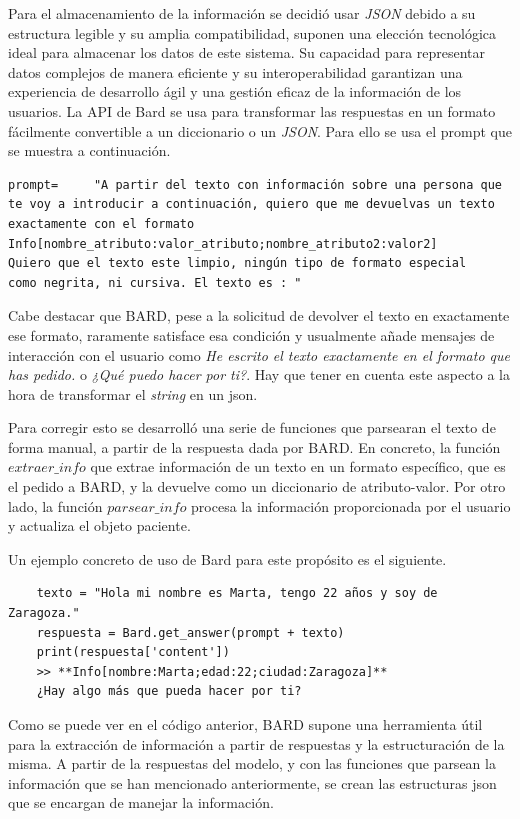 Para el almacenamiento de la información se decidió usar \textit{JSON} debido a su estructura legible y su amplia compatibilidad, suponen una elección tecnológica ideal para almacenar los datos de este sistema. Su capacidad para representar datos complejos de manera eficiente y su interoperabilidad garantizan una experiencia de desarrollo ágil y una gestión eficaz de la información de los usuarios. La API de Bard se usa para transformar las respuestas en un formato fácilmente convertible a un diccionario o un \textit{JSON}. Para ello se usa el prompt que se muestra a continuación.

\begin{verbatim}
prompt= 	"A partir del texto con información sobre una persona que
te voy a introducir a continuación, quiero que me devuelvas un texto
exactamente con el formato
Info[nombre_atributo:valor_atributo;nombre_atributo2:valor2]
Quiero que el texto este limpio, ningún tipo de formato especial
como negrita, ni cursiva. El texto es : "
\end{verbatim} 

Cabe destacar que BARD, pese a la solicitud de devolver el texto en exactamente ese formato, raramente satisface esa condición y usualmente añade mensajes de interacción con el usuario como \textit{He escrito el texto exactamente en el formato que has pedido.} o \textit{¿Qué puedo hacer por ti?}. Hay que tener en cuenta este aspecto a la hora de transformar el \textit{string} en un json. 

Para corregir esto se desarrolló una serie de funciones que parsearan el texto de forma manual, a partir de la respuesta dada por BARD. En concreto, la función $extraer\_info$ que extrae información de un texto en un formato específico, que es el pedido a BARD, y la devuelve como un diccionario de atributo-valor. Por otro lado, la función $parsear\_info$ procesa la información proporcionada por el usuario y actualiza el objeto paciente.

Un ejemplo concreto de uso de Bard para este propósito es el siguiente. 
\begin{verbatim}
	texto = "Hola mi nombre es Marta, tengo 22 años y soy de Zaragoza."
	respuesta = Bard.get_answer(prompt + texto)
	print(respuesta['content'])
	>> **Info[nombre:Marta;edad:22;ciudad:Zaragoza]** 
	¿Hay algo más que pueda hacer por ti?
\end{verbatim}

Como se puede ver en el código anterior, BARD supone una herramienta útil para la extracción de información a partir de respuestas y la estructuración de la misma. A partir de la respuestas del modelo, y con las funciones que parsean la información que se han mencionado anteriormente, se crean las estructuras json que se encargan de manejar la información. 

